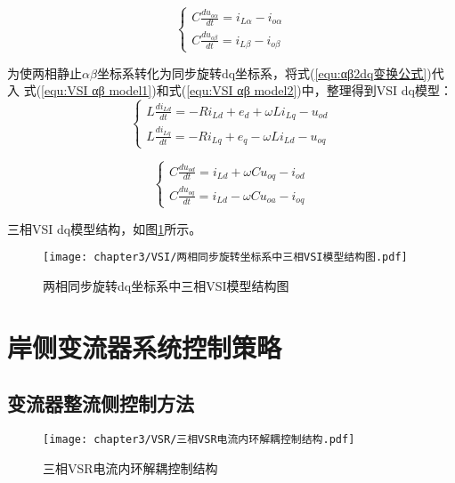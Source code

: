 \begin{equation}
	\begin{cases}
		C\frac{du_{o\alpha}}{dt}=i_{L\alpha}-i_{o\alpha} \\
		C\frac{du_{o\beta}}{dt}=i_{L\beta}-i_{o\beta}
	\end{cases}
	\label{equ:VSI αβ model2}
\end{equation}

为使两相静止$\alpha\beta$坐标系转化为同步旋转dq坐标系，将式(\ref{equ:αβ2dq变换公式})代入
式(\ref{equ:VSI αβ model1})和式(\ref{equ:VSI αβ model2})中，整理得到VSI dq模型：
\begin{equation}
	\begin{cases}
		L\frac{di_{Ld}}{dt}=-Ri_{Ld}+e_{d}+\omega Li_{Lq}-u_{od} \\
		L\frac{di_{Lq}}{dt}=-Ri_{Lq}+e_{q}-\omega Li_{Ld}-u_{oq}
	\end{cases}
	\label{equ:VSI dq model1}
\end{equation}

\begin{equation}
	\begin{cases}
		C\frac{du_{od}}{dt}=i_{Ld}+\omega Cu_{oq}-i_{od} \\
		C\frac{du_{oq}}{dt}=i_{Ld}-\omega Cu_{oa}-i_{oq}
	\end{cases}
	\label{equ:VSI dq model2}
\end{equation}

三相VSI dq模型结构，如图\ref{fig:两相同步旋转dq坐标系中三相VSI模型结构图}所示。

\begin{figure}[!htp]
	\centering
	\texttt{[image: chapter3/VSI/两相同步旋转坐标系中三相VSI模型结构图.pdf]}
	\caption{两相同步旋转dq坐标系中三相VSI模型结构图}
	\label{fig:两相同步旋转dq坐标系中三相VSI模型结构图}
\end{figure}

\section{岸侧变流器系统控制策略}

\subsection{变流器整流侧控制方法}

\zhlipsum[3]

\begin{figure}[!htp]
	\centering
	\texttt{[image: chapter3/VSR/三相VSR电流内环解耦控制结构.pdf]}
	\caption{三相VSR电流内环解耦控制结构}
	\label{fig:三相VSR电流内环解耦控制结构}
\end{figure}

